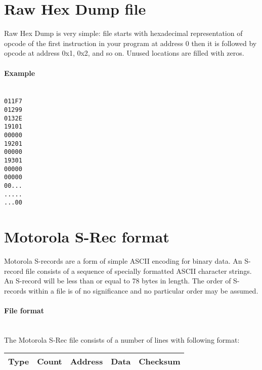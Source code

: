\section{Raw Hex Dump file}
    Raw Hex Dump is very simple: file starts with hexadecimal representation of opcode of the first instruction in your program at address 0 then it is followed by opcode at address 0x1, 0x2, and so on. Unused locations are filled with zeros.

    \paragraph{Example}
        ~\\
        \verb'011F7'\\
        \verb'01299'\\
        \verb'0132E'\\
        \verb'19101'\\
        \verb'00000'\\
        \verb'19201'\\
        \verb'00000'\\
        \verb'19301'\\
        \verb'00000'\\
        \verb'00000'\\
        \verb'00...'\\
        \verb'.....'\\
        \verb'...00'\\

\clearpage
\section{Motorola S-Rec format}
    Motorola S-records are a form of simple ASCII encoding for binary data. An S-record file consists of a sequence of specially formatted ASCII character strings. An S-record will be less than or equal to 78 bytes in length. The order of S-records within a file is of no significance and no particular order may be assumed.

    \paragraph{File format}
        ~\\
        The Motorola S-Rec file consists of a number of lines with following format:\\
        \begin{tabular}{|ccccc|}
            \hline
            Type & Count & Address & Data & Checksum \\
            \hline
        \end{tabular}

